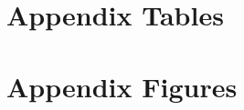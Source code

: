 \documentclass{article}
\begin{document}

\clearpage
\nocite{*}
\printbibliography


\clearpage

\section*{}
\vspace{5mm}

\appendix

\renewcommand\thetable{\thesection.\arabic{table}}    
\renewcommand\thefigure{\thesection.\arabic{figure}} 
\setcounter{table}{0}
\setcounter{figure}{0}

\section{Appendix Tables}


\clearpage
\section{Appendix Figures}



\end{document}
